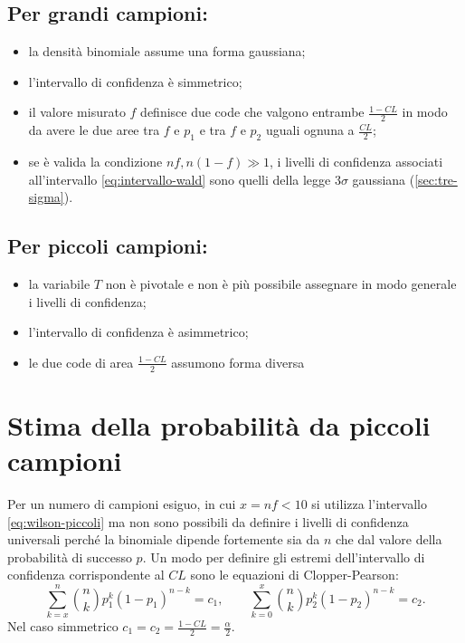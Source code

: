 \subsection{Per grandi campioni:}
\begin{itemize}
\item la densità binomiale assume una forma gaussiana;
\item l'intervallo di confidenza è simmetrico;
\item il valore misurato $f$ definisce due code che valgono entrambe $\frac{1-CL}{2}$ in modo da avere le due aree tra $f$ e $p_1$ e tra $f$ e $p_2$ uguali ognuna a $\frac{CL}{2}$;
\item se è valida la condizione $nf, n(1-f)\gg 1$, i livelli di confidenza associati all'intervallo \ref{eq:intervallo-wald} sono quelli della legge $3\sigma$ gaussiana (\ref{sec:tre-sigma}).
\end{itemize}
\subsection{Per piccoli campioni:}
\begin{itemize}
\item la variabile $T$ non è pivotale e non è più possibile assegnare in modo generale i livelli di confidenza;
\item l'intervallo di confidenza è asimmetrico;
\item le due code di area $\frac{1-CL}{2}$ assumono forma diversa
\end{itemize}

\section{Stima della probabilità da piccoli campioni} %
\label{sec:stima-prob-piccoli}
Per un numero di campioni esiguo, in cui $x=nf<10$ si utilizza l'intervallo \ref{eq:wilson-piccoli} ma non sono possibili da definire i livelli di confidenza universali perché la binomiale dipende fortemente sia da $n$ che dal valore della probabilità di successo $p$.
Un modo per definire gli estremi dell'intervallo di confidenza corrispondente al $CL$ sono le equazioni di Clopper-Pearson:
\begin{equation}
\label{eq:clopper-pearson}
\sum _{ k=x }^{ n }{ { n\choose k }{ p }_{ 1 }^{ k }{ \left( 1-{ p }_{ 1 } \right)  }^{ n-k } } ={ c }_{ 1 },\qquad \sum _{ k=0 }^{ x }{ { n\choose k }{ p }_{ 2 }^{ k }{ \left( 1-{ p }_{ 2 } \right)  }^{ n-k } } ={ c }_{ 2 }.
\end{equation}
Nel caso simmetrico $c_1=c_2=\frac{1-CL}{2}=\frac{\alpha}{2}$.

